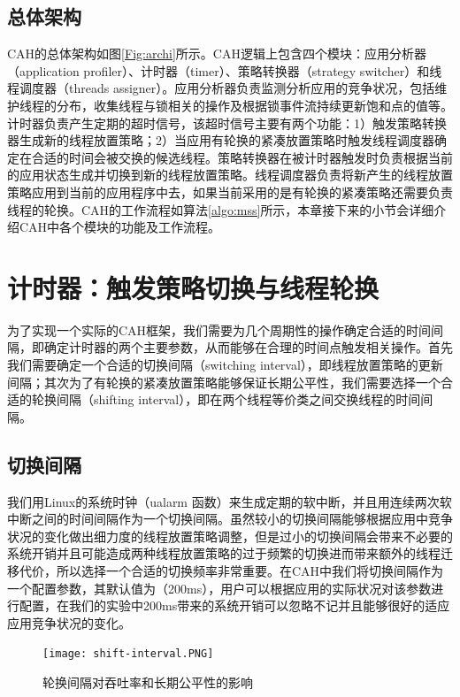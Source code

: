 \subsection{总体架构}
CAH的总体架构如图\ref{Fig:archi}所示。CAH逻辑上包含四个模块：应用分析器（application profiler）、计时器（timer）、策略转换器（strategy switcher）和线程调度器（threads assigner）。应用分析器负责监测分析应用的竞争状况，包括维护线程的分布，收集线程与锁相关的操作及根据锁事件流持续更新饱和点的值等。计时器负责产生定期的超时信号，该超时信号主要有两个功能：1）触发策略转换器生成新的线程放置策略；2）当应用有轮换的紧凑放置策略时触发线程调度器确定在合适的时间会被交换的候选线程。策略转换器在被计时器触发时负责根据当前的应用状态生成并切换到新的线程放置策略。线程调度器负责将新产生的线程放置策略应用到当前的应用程序中去，如果当前采用的是有轮换的紧凑策略还需要负责线程的轮换。CAH的工作流程如算法\ref{algo:mss}所示，本章接下来的小节会详细介绍CAH中各个模块的功能及工作流程。



\section{计时器：触发策略切换与线程轮换}
为了实现一个实际的CAH框架，我们需要为几个周期性的操作确定合适的时间间隔，即确定计时器的两个主要参数，从而能够在合理的时间点触发相关操作。首先我们需要确定一个合适的切换间隔（switching interval），即线程放置策略的更新间隔；其次为了有轮换的紧凑放置策略能够保证长期公平性，我们需要选择一个合适的轮换间隔（shifting interval），即在两个线程等价类之间交换线程的时间间隔。

\subsection{切换间隔}
我们用Linux的系统时钟（ualarm 函数）来生成定期的软中断，并且用连续两次软中断之间的时间间隔作为一个切换间隔。虽然较小的切换间隔能够根据应用中竞争状况的变化做出细力度的线程放置策略调整，但是过小的切换间隔会带来不必要的系统开销并且可能造成两种线程放置策略的过于频繁的切换进而带来额外的线程迁移代价，所以选择一个合适的切换频率非常重要。在CAH中我们将切换间隔作为一个配置参数，其默认值为（200ms），用户可以根据应用的实际状况对该参数进行配置，在我们的实验中200ms带来的系统开销可以忽略不记并且能够很好的适应应用竞争状况的变化。

\begin{figure}[t]
	\centering
	\texttt{[image: shift-interval.PNG]}
	\caption{轮换间隔对吞吐率和长期公平性的影响}
	\label{Fig:shift-interval}
\end{figure}

